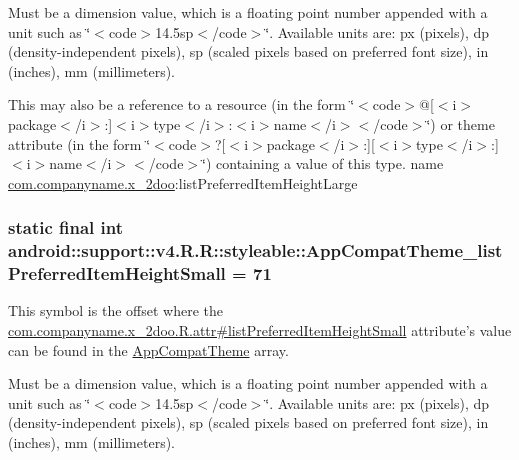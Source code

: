 Must be a dimension value, which is a floating point number appended with a unit such as \char`\"{}$<$code$>$14.5sp$<$/code$>$\char`\"{}. Available units are: px (pixels), dp (density-independent pixels), sp (scaled pixels based on preferred font size), in (inches), mm (millimeters). 

This may also be a reference to a resource (in the form \char`\"{}$<$code$>$@\mbox{[}$<$i$>$package$<$/i$>$:\mbox{]}$<$i$>$type$<$/i$>$:$<$i$>$name$<$/i$>$$<$/code$>$\char`\"{}) or theme attribute (in the form \char`\"{}$<$code$>$?\mbox{[}$<$i$>$package$<$/i$>$:\mbox{]}\mbox{[}$<$i$>$type$<$/i$>$:\mbox{]}$<$i$>$name$<$/i$>$$<$/code$>$\char`\"{}) containing a value of this type.  name \hyperlink{namespacecom_1_1companyname_1_1x__2doo}{com.companyname.x\_\-2doo}:listPreferredItemHeightLarge \hypertarget{classandroid_1_1support_1_1v4_1_1_r_1_1styleable_fee8f8be3df435711c5bb0d3b5eb1bdd}{
\subsubsection[{AppCompatTheme\_\-listPreferredItemHeightSmall}]{\setlength{\rightskip}{0pt plus 5cm}static final int android::support::v4.R.R::styleable::AppCompatTheme\_\-listPreferredItemHeightSmall = 71}}
\label{classandroid_1_1support_1_1v4_1_1_r_1_1styleable_fee8f8be3df435711c5bb0d3b5eb1bdd}


This symbol is the offset where the \hyperlink{classcom_1_1companyname_1_1x__2doo_1_1_r_1_1attr_9fe0dfb3cf4a868c1cb451ec9e3c372f}{com.companyname.x\_\-2doo.R.attr\#listPreferredItemHeightSmall} attribute's value can be found in the \hyperlink{classandroid_1_1support_1_1v4_1_1_r_1_1styleable_0873e92ba21076bb5a4aeadeb7f5779f}{AppCompatTheme} array.

Must be a dimension value, which is a floating point number appended with a unit such as \char`\"{}$<$code$>$14.5sp$<$/code$>$\char`\"{}. Available units are: px (pixels), dp (density-independent pixels), sp (scaled pixels based on preferred font size), in (inches), mm (millimeters). 

